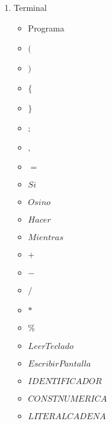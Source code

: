 \documentclass{article}
\begin{document}
\begin{enumerate}
	\item Terminal
	\begin{itemize}                                                                                                          
			\item Programa
\item $($
\item $)$
\item $ \lbrace $
\item $ \rbrace $
\item $;$
\item $,$
\item $=$
\item $Si$
\item $Osino$
\item $Hacer$
\item $Mientras$
\item $+$
\item $-$
\item $/$
\item $*$
\item $\%$
\item $LeerTeclado$
\item $EscribirPantalla$
\item $IDENTIFICADOR$
\item $CONST$\textunderscore $NUMERICA$
\item $LITERAL$\textunderscore $CADENA$

	\end{itemize}
	

\end{enumerate}
\end{document}
